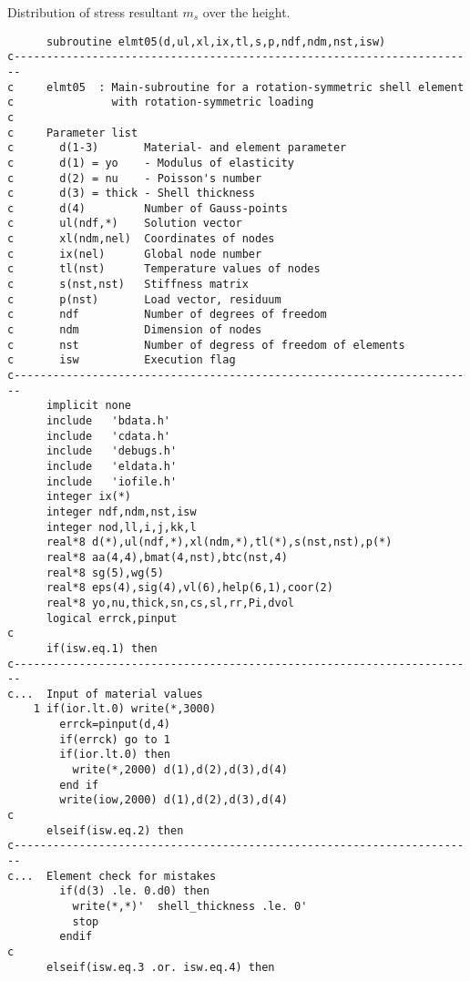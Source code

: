 \begin{Figure}[htb]
\begin{center}
\setlength{\baselineskip}{11pt}
\caption{Distribution of stress resultant $m_s$ over the 
height.}
\label{zyl}
\end{center}
\end{Figure}%

\clearpage
\newpage
{\small
\begin{verbatim}
      subroutine elmt05(d,ul,xl,ix,tl,s,p,ndf,ndm,nst,isw)
c-----------------------------------------------------------------------
c     elmt05  : Main-subroutine for a rotation-symmetric shell element
c               with rotation-symmetric loading
c
c     Parameter list
c       d(1-3)       Material- and element parameter
c       d(1) = yo    - Modulus of elasticity
c       d(2) = nu    - Poisson's number
c       d(3) = thick - Shell thickness 
c       d(4)         Number of Gauss-points
c       ul(ndf,*)    Solution vector
c       xl(ndm,nel)  Coordinates of nodes
c       ix(nel)      Global node number
c       tl(nst)      Temperature values of nodes
c       s(nst,nst)   Stiffness matrix
c       p(nst)       Load vector, residuum
c       ndf          Number of degrees of freedom
c       ndm          Dimension of nodes
c       nst          Number of degress of freedom of elements
c       isw          Execution flag
c-----------------------------------------------------------------------
      implicit none
      include   'bdata.h'
      include   'cdata.h'
      include   'debugs.h'
      include   'eldata.h'
      include   'iofile.h'
      integer ix(*)
      integer ndf,ndm,nst,isw
      integer nod,ll,i,j,kk,l
      real*8 d(*),ul(ndf,*),xl(ndm,*),tl(*),s(nst,nst),p(*)
      real*8 aa(4,4),bmat(4,nst),btc(nst,4)
      real*8 sg(5),wg(5)
      real*8 eps(4),sig(4),vl(6),help(6,1),coor(2)
      real*8 yo,nu,thick,sn,cs,sl,rr,Pi,dvol
      logical errck,pinput
c
      if(isw.eq.1) then
c-----------------------------------------------------------------------
c...  Input of material values
    1 if(ior.lt.0) write(*,3000)
        errck=pinput(d,4)
        if(errck) go to 1
        if(ior.lt.0) then
          write(*,2000) d(1),d(2),d(3),d(4)
        end if
        write(iow,2000) d(1),d(2),d(3),d(4)
c
      elseif(isw.eq.2) then
c-----------------------------------------------------------------------
c...  Element check for mistakes
        if(d(3) .le. 0.d0) then
          write(*,*)'  shell_thickness .le. 0'
          stop
        endif
c 
      elseif(isw.eq.3 .or. isw.eq.4) then

\end{verbatim}}
